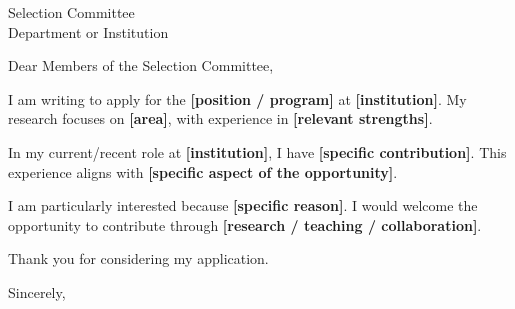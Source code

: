 \documentclass[11pt]{letter}
\begin{document}
\begin{letter}{Selection Committee\\Department or Institution}
\opening{Dear Members of the Selection Committee,}
I am writing to apply for the \textbf{[position / program]} at \textbf{[institution]}.
My research focuses on \textbf{[area]}, with experience in \textbf{[relevant strengths]}.

In my current/recent role at \textbf{[institution]}, I have \textbf{[specific contribution]}.
This experience aligns with \textbf{[specific aspect of the opportunity]}.

I am particularly interested because \textbf{[specific reason]}. I would welcome the opportunity
to contribute through \textbf{[research / teaching / collaboration]}.

Thank you for considering my application.
\closing{Sincerely,}
\end{letter}
\end{document}
